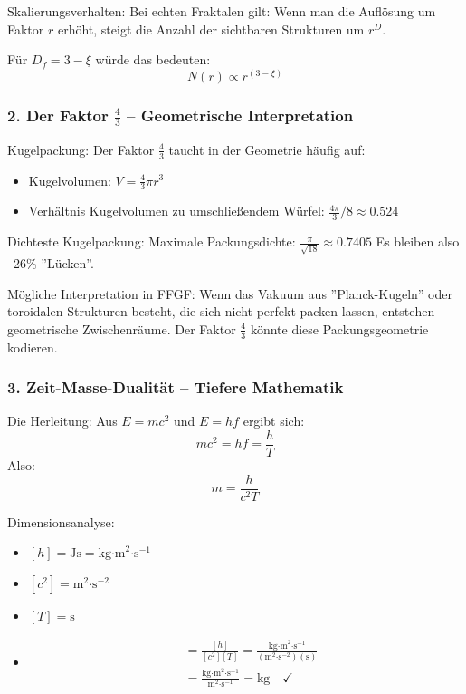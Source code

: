 \documentclass[12pt,a4paper]{article}
\begin{document}
	Skalierungsverhalten:
	Bei echten Fraktalen gilt: Wenn man die Auflösung um Faktor \( r \) erhöht, steigt die Anzahl der sichtbaren Strukturen um \( r^D \).
	
	Für \( D_f = 3 - \xi \) würde das bedeuten:
	\[
	N(r) \propto r^{(3-\xi)}
	\]
	
	\subsubsection{2. Der Faktor \( \frac{4}{3} \) – Geometrische Interpretation}
	Kugelpackung:
	Der Faktor \( \frac{4}{3} \) taucht in der Geometrie häufig auf:
	\begin{itemize}
		\item Kugelvolumen: \( V = \frac{4}{3}\pi r^3 \)
		\item Verhältnis Kugelvolumen zu umschließendem Würfel: \( \frac{4\pi}{3}/8 \approx 0.524 \)
	\end{itemize}
	
	Dichteste Kugelpackung:
	Maximale Packungsdichte: \( \frac{\pi}{\sqrt{18}} \approx 0.7405 \)
	Es bleiben also ~26\% ''Lücken''.
	
	Mögliche Interpretation in FFGF:
	Wenn das Vakuum aus ''Planck-Kugeln'' oder toroidalen Strukturen besteht, die sich nicht perfekt packen lassen, entstehen geometrische Zwischenräume. Der Faktor \( \frac{4}{3} \) könnte diese Packungsgeometrie kodieren.
	
	\subsubsection{3. Zeit-Masse-Dualität – Tiefere Mathematik}
	Die Herleitung:
	Aus \( E = mc^2 \) und \( E = hf \) ergibt sich:
	\[
	mc^2 = hf = \frac{h}{T}
	\]
	Also:
	\[
	m = \frac{h}{c^2 T}
	\]
	
	Dimensionsanalyse:
	\begin{itemize}
		\item \( [h] = \text{Js} = \text{kg·m}^2\text{·s}^{-1} \)
		\item \( [c^2] = \text{m}^2\text{·s}^{-2} \)
		\item \( [T] = \text{s} \)
		\item \begin{align}
			[m] &= \frac{[h]}{[c^2][T]} = \frac{\text{kg·m}^2\text{·s}^{-1}}{(\text{m}^2\text{·s}^{-2})(\text{s})} \\
			&= \frac{\text{kg·m}^2\text{·s}^{-1}}{\text{m}^2\text{·s}^{-1}} = \text{kg} \quad \checkmark
		\end{align}
	\end{itemize}
	
\end{document}
